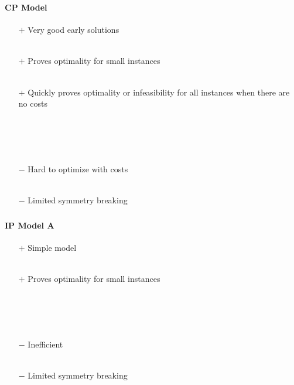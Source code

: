 \documentclass{beamer}
\newcommand{\AutoSectionTitle}{}
\begin{document}
\begin{frame}
  \frametitle{\AutoSectionTitle}
  \framesubtitle{CP Model}

  \begin{itemize}
  \item[$+$] Very good early solutions \\~\\
  \item[$+$] Proves optimality for small instances \\~\\
  \item[$+$] Quickly proves optimality or infeasibility for all instances when there are no costs \\~\\~\\~\\~\\

    \pause
    
  \item[$-$] Hard to optimize with costs \\~\\
  \item[$-$] Limited symmetry breaking
  \end{itemize}

\end{frame}




\begin{frame}
  \frametitle{\AutoSectionTitle}
  \framesubtitle{IP Model A}

  \begin{itemize}
  \item[$+$] Simple model \\~\\
  \item[$+$] Proves optimality for small instances \\~\\~\\~\\~\\

    \pause
    
  \item[$-$] Inefficient \\~\\
  \item[$-$] Limited symmetry breaking
  \end{itemize}

\end{frame}
\end{document}
